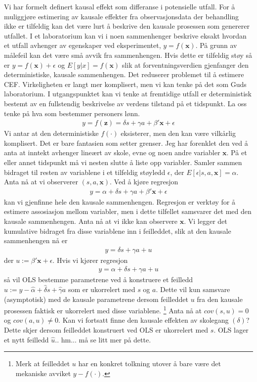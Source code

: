Vi har formelt definert kausal effekt som differanse i potensielle utfall. For å muliggjøre estimering av kausale effekter fra observasjonsdata der behandling ikke er tilfeldig kan det være lurt å beskrive den kausale prosessen som genererer utfallet. I et laboratorium kan vi i noen sammenhenger beskrive eksakt hvordan et utfall avhenger av egenskaper ved eksperimentet, $y=f(\mathbf{x})$. På grunn av målefeil kan det være små avvik fra sammenhengen. Hvis dette er tilfeldig støy så er $y=f(\mathbf{x})+\epsilon$ og $E[y|x]=f(\mathbf{x})$ slik at forventningsverdien gjenfanger den deterministiske, kausale sammenhengen. Det reduserer problemet til å estimere CEF. Virkeligheten er langt mer komplisert, men vi kan tenke på det som Guds laboratorium. I utgangspunktet kan vi tenke at fremtidige utfall er deterministisk bestemt av en fullstendig beskrivelse av verdens tilstand på et tidspunkt. La oss tenke på hva som bestemmer personers lønn.
\begin{align}
y=f(\mathbf{z})=\delta s +\gamma a + \beta ' \mathbf{x} + \epsilon
\end{align}
Vi antar at den deterministiske $f(\cdot)$ eksisterer, men den kan være vilkårlig komplisert. Det er bare fantasien som setter grenser. Jeg har forenklet den ved å anta at inntekt avhenger lineært av skole, evne og noen andre variabler $\mathbf{x}$. På et eller annet tidspunkt må vi nesten slutte å liste opp variabler. Samler sammen bidraget til resten av variablene i et tilfeldig støyledd $\epsilon$, der $E[\epsilon|s,a,\mathbf{x}]=\alpha$. Anta nå at vi observerer $(s,a,\mathbf{x})$. Ved å kjøre regresjon
\begin{align}
y=\alpha+\delta s +\gamma a + \beta ' \mathbf{x} + \epsilon
\end{align}
kan vi gjenfinne hele den kausale sammenhengen. Regresjon er verktøy for å estimere assosiasjon mellom variabler, men i dette tilfellet samsvarer det med den kausale sammenhengen. Anta nå at vi ikke kan observere $\mathbf{x}$. Vi legger det kumulative bidraget fra disse variablene inn i feilleddet, slik at den kausale sammenhengen nå er 
\begin{align}
y = \delta s +\gamma a + u
\end{align}
der $u:=\beta ' \mathbf{x} + \epsilon$. Hvis vi kjører regresjon
\begin{align}
y = \alpha +\delta s +\gamma a + u
\end{align}
så vil OLS bestemme parametrene ved å konstruere et feilledd $\hat{u}:=y-\hat{\alpha} +\hat{\delta} s +\hat{\gamma} a$ som er ukorrelert med $s$ og $a$. Dette vil kun samsvare (asymptotisk) med de kausale parametrene dersom feilleddet $u$ fra den kausale prosessen faktisk er ukorrelert med disse variablene. \footnote{Merk at feilleddet $u$ har en konkret tolkning utover å bare være det mekaniske avviket $y-f(\cdot)$.} Anta nå at $cov(s,u) = 0$ og $cov(a,u) \neq 0$. Kan vi fortsatt finne den kausale effekten av skolegang $(\delta)$?  Dette skjer dersom feilleddet konstruert ved OLS er ukorrelert med $s$. OLS lager et nytt feilledd $\hat{u}$.. hm... må se litt mer på dette. 
